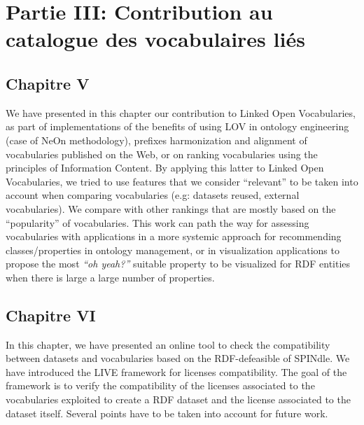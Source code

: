 \documentclass[a4paper,11pt,twoside]{report}
\begin{document}
\chapter*{Partie III: Contribution au catalogue des vocabulaires liés}

\section*{Chapitre V}

We have presented in this chapter our contribution to Linked Open Vocabularies, as part of implementations of the benefits of using LOV in ontology engineering (case of NeOn methodology), prefixes harmonization and alignment of vocabularies published on the Web, or on ranking vocabularies using the principles of Information Content. By applying this latter to Linked Open Vocabularies, we tried to use features that we consider ``relevant'' to be taken into account when comparing vocabularies (e.g: datasets reused, external vocabularies). We compare with other rankings that are mostly based on the ``popularity'' of vocabularies. This work can path the way for assessing vocabularies with applications in a more systemic approach for recommending classes/properties in ontology management, or in visualization applications to propose the most \textit{``oh yeah?''} suitable property to be visualized for RDF entities when there is large a large number of properties.

\section*{Chapitre VI}

In this chapter, we have presented an online tool to check the compatibility between datasets and vocabularies based on the RDF-defeasible of SPINdle. We have introduced the LIVE framework for licenses compatibility. The goal of the framework is to verify the compatibility of the licenses associated to the vocabularies exploited to create a RDF dataset and the license associated to the dataset itself. Several points have to be taken into account for future work. 
\end{document}
